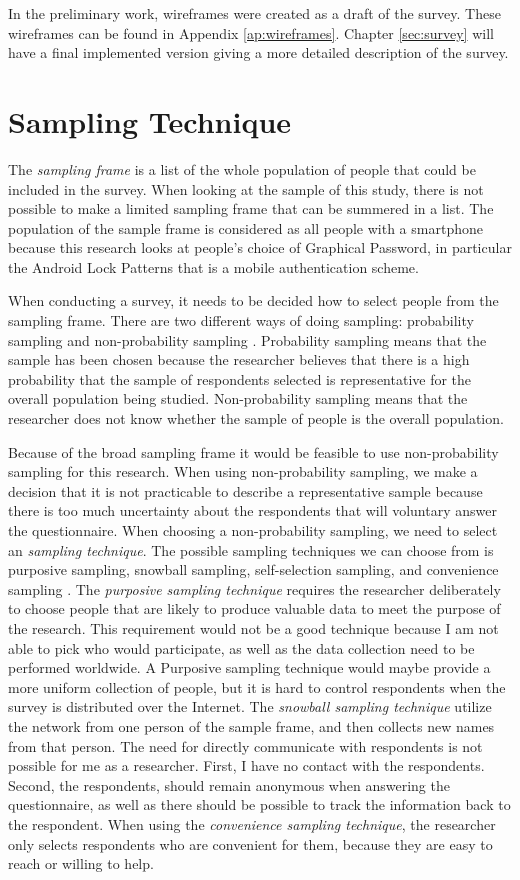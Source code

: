     In the preliminary work, wireframes were created as a draft of the survey. These wireframes can be found in Appendix \ref{ap:wireframes}. Chapter \ref{sec:survey} will have a final implemented version giving a more detailed description of the survey.

  \section{Sampling Technique}\label{sec:samplingTechnique}
    The {\it sampling frame} is a list of the whole population of people that could be included in the survey. When looking at the sample of this study, there is not possible to make a limited sampling frame that can be summered in a list. The population of the sample frame is considered as all people with a smartphone because this research looks at people's choice of Graphical Password, in particular the Android Lock Patterns that is a mobile authentication scheme.

    When conducting a survey, it needs to be decided how to select people from the sampling frame. There are two different ways of doing sampling: probability sampling and non-probability sampling \cite{empiriske}. Probability sampling means that the sample has been chosen because the researcher believes that there is a high probability that the sample of respondents selected is representative for the overall population being studied. Non-probability sampling means that the researcher does not know whether the sample of people is the overall population.

    Because of the broad sampling frame it would be feasible to use non-probability sampling for this research. When using non-probability sampling, we make a decision that it is not practicable to describe a representative sample because there is too much uncertainty about the respondents that will voluntary answer the questionnaire. When choosing a non-probability sampling, we need to select an {\it sampling technique}. The possible sampling techniques we can choose from is purposive sampling, snowball sampling, self-selection sampling, and convenience sampling \cite{empiriske}. The {\it purposive sampling technique} requires the researcher deliberately to choose people that are likely to produce valuable data to meet the purpose of the research. This requirement would not be a good technique because I am not able to pick who would participate, as well as the data collection need to be performed worldwide. A Purposive sampling technique would maybe provide a more uniform collection of people, but it is hard to control respondents when the survey is distributed over the Internet.
    The {\it snowball sampling technique} utilize the network from one person of the sample frame, and then collects new names from that person. The need for directly communicate with respondents is not possible for me as a researcher. {First}, I have no contact with the respondents. {Second}, the respondents, should remain anonymous when answering the questionnaire, as well as there should be possible to track the information back to the respondent. When using the {\it convenience sampling technique}, the researcher only selects respondents who are convenient for them, because they are easy to reach or willing to help.

